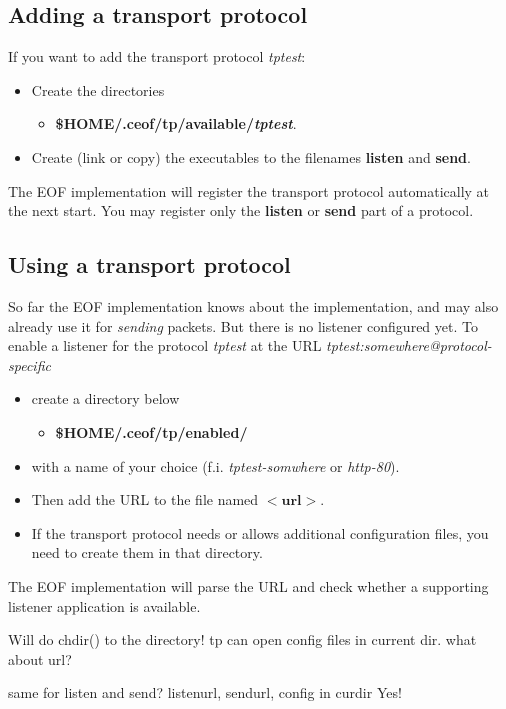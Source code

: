 \documentclass[12pt,a4paper]{book}
\begin{document}
\subsection{Adding a transport protocol}
If you want to add the transport protocol \emph{tptest}:
\begin{itemize}
\item Create the directories
\begin{itemize}
\item \textbf{\$HOME/.ceof/tp/available/\emph{tptest}}.
\end{itemize}
\item Create (link or copy) the executables to the filenames \textbf{listen}
and \textbf{send}.
\end{itemize}
The EOF implementation will register the transport protocol automatically
at the next start. You may register only the \textbf{listen} or
\textbf{send} part of a protocol.
\subsection{Using a transport protocol}
So far the EOF implementation knows about the implementation, and may also
already use it for \emph{sending} packets. But there is no listener configured
yet.
To enable a listener for the protocol \emph{tptest} at the URL
\emph{tptest:somewhere@protocol-specific}
\begin{itemize}
\item create a directory below
\begin{itemize}
\item \textbf{\$HOME/.ceof/tp/enabled/}
\end{itemize}
\item with a name of your choice (f.i. \emph{tptest-somwhere} or \emph{http-80}).
\item Then add the URL to the file named $<\textbf{url}>$.
\item If the transport protocol needs or allows additional configuration files,
you need to create them in that directory.
\end{itemize}
The EOF implementation will parse the URL and check whether a supporting
listener application is available.

Will do chdir() to the directory! tp can open config files in current dir.
what about url?

same for listen and send?
   listenurl, sendurl, config in curdir
Yes!
\end{document}
